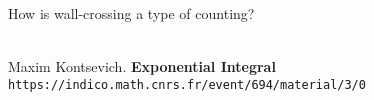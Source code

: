\documentclass[12pt]{article}
\begin{document}
\noindent How is wall-crossing a type of counting? \\ \\




\newpage

\selectfont \fontsize{12}{10}\selectfont

\begin{thebibliography}{}



\item Maxim Kontsevich.  \textbf{Exponential Integral} \texttt{https://indico.math.cnrs.fr/event/694/material/3/0}

\end{thebibliography}
\end{document}
